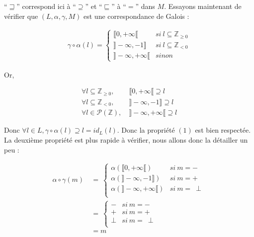\documentclass[french]{article}
\newcommand\si{\textit{si}}
\newcommand\sinon{\textit{sinon}}
\begin{document}
  ``$\sqsupseteq$'' correspond ici à ``$\supseteq$'' et ``$\sqsubseteq$'' à ``$=$'' dans $M$. Essayons maintenant de vérifier que $(L, \alpha, \gamma, M)$ est une correspondance de Galois :
  
  \begin{align*}
    \gamma \circ \alpha (l) = \left\{ 
    \begin{array}{ll}
      \llbracket 0, +\infty\llbracket & \si\ l \subseteq \mathds{Z}_{\geq 0}\\
      \rrbracket -\infty, -1\rrbracket & \si\ l \subseteq \mathds{Z}_{< 0}\\
      \rrbracket -\infty, +\infty\llbracket & \sinon\
    \end{array} \right.
  \end{align*}
  
  Or,
  
  \begin{align*}
    \forall l \subseteq \mathds{Z}_{\geq 0},\ & \llbracket 0, +\infty\llbracket \supseteq l\\
    \forall l \subseteq \mathds{Z}_{< 0},\    & \rrbracket -\infty, -1\rrbracket \supseteq l\\
    \forall l \in \mathscr{P}(\mathds{Z}),\   & \rrbracket -\infty, +\infty\llbracket \supseteq l
  \end{align*}
  
  Donc $\forall l \in L, \gamma \circ \alpha (l) \supseteq l = id_L(l)$. Donc la propriété $(1)$ est bien respectée.
  La deuxième propriété est plus rapide à vérifier, nous allons donc la détailler un peu :
  
  \begin{align*}
    \alpha \circ \gamma (m)\ &=\ \left\{ 
    \begin{array}{ll}
      \alpha (\llbracket 0, +\infty\llbracket) & \si\ m = -\\
      \alpha (\rrbracket -\infty, -1\rrbracket) & \si\ m = +\\
      \alpha (\rrbracket -\infty, +\infty\llbracket)  & \si\ m =\ \perp\\
    \end{array} \right.\\
    &= \ \left\{ 
    \begin{array}{ll}
      - & \si\ m = -\\
      + & \si\ m = +\\
      \perp  & \si\ m =\ \perp\\
    \end{array} \right.\\
    &= m
  \end{align*}
  
\end{document}

